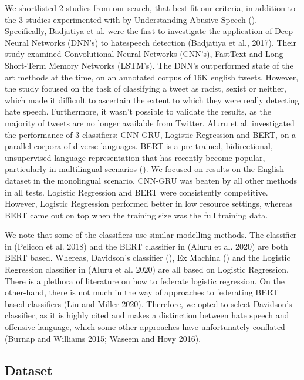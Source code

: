 \documentclass[letterpaper]{article} %
\begin{document}
We shortlisted 2 studies from our search, that best fit our criteria, in addition to the 3 studies experimented with by Understanding Abusive Speech (). Specifically, Badjatiya et al. were the first to investigate the application of Deep Neural Networks (DNN's) to  hatespeech detection (Badjatiya et al., 2017). Their study examined Convolutional Neural Networks (CNN's), FastText and Long Short-Term Memory Networks (LSTM's). The DNN's outperformed state of the art methods at the time, on an annotated corpus of 16K english tweets. However, the study focused on the task of classifying a tweet as racist, sexist or neither, which made it difficult to ascertain the extent to which they were really detecting hate speech. Furthermore, it wasn't possible to validate the results, as the majority of tweets are no longer available from Twitter. Aluru et al. investigated the performance of 3 classifiers: CNN-GRU, Logistic Regression and BERT, on a parallel corpora of diverse languages. BERT is a pre-trained, bidirectional, unsupervised language representation  that has recently become popular, particularly in multilingual scenarios (). We focused on results on the English dataset in the monolingual scenario. CNN-GRU was beaten by all other methods in all tests. Logistic Regression and BERT were consistently competitive. However, Logistic Regression performed better in low resource settings, whereas BERT came out on top when the training size was the full training data.

We note that some of the classifiers use similar modelling methods. The classifier in (Pelicon et al. 2018) and the BERT classifier in (Aluru et al. 2020) are both BERT based. Whereas, Davidson's classifier (), Ex Machina () and the Logistic Regression classifier in (Aluru et al. 2020) are all based on Logistic Regression. There is a plethora of literature on how to federate logistic regression. On the other-hand, there is not much in the way of approaches to federating BERT based classifiers (Liu and Miller 2020). Therefore, we opted to select Davidson's classifier, as it is highly cited and makes a distinction between hate speech and offensive language, which some other approaches have unfortunately conflated (Burnap and Williams 2015; Waseem and Hovy 2016).

\subsection{Dataset}
\end{document}
